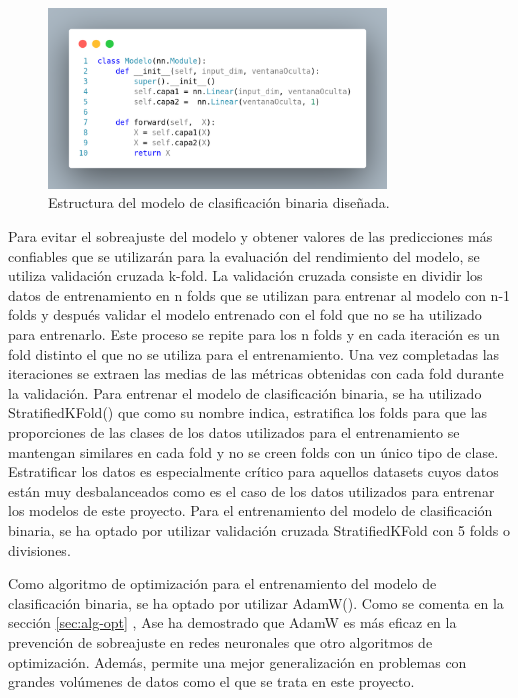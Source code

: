 \begin{figure}[H]
    \centering
    \includegraphics[width=0.8\textwidth]{./img/modelo/modeloBIN.png}
    \caption{Estructura del modelo de clasificación binaria diseñada.}
    \label{fig:modBIN}
\end{figure}

Para evitar el sobreajuste del modelo y obtener valores de las predicciones más confiables que se utilizarán para la evaluación del rendimiento del modelo, se utiliza validación cruzada k-fold. La validación cruzada consiste en dividir los datos de entrenamiento en n folds que se utilizan para entrenar al modelo con n-1 folds y después validar el modelo entrenado con el fold que no se ha utilizado para entrenarlo. Este proceso se repite para los n folds y en cada iteración es un fold distinto el que no se utiliza para el entrenamiento. Una vez completadas las iteraciones se extraen las medias de las métricas obtenidas con cada fold durante la validación. Para entrenar el modelo de clasificación binaria, se ha utilizado StratifiedKFold() que como su nombre indica, estratifica los folds para que las proporciones de las clases de los datos utilizados para el entrenamiento se mantengan similares en cada fold y no se creen folds con un único tipo de clase. Estratificar los datos es especialmente crítico para aquellos datasets cuyos datos están muy desbalanceados como es el caso de los datos utilizados para entrenar los modelos de este proyecto. Para el entrenamiento del modelo de clasificación binaria, se ha optado por utilizar validación cruzada StratifiedKFold con 5 folds o divisiones.

Como algoritmo de optimización para el entrenamiento del modelo de clasificación binaria, se ha optado por utilizar AdamW(). Como se comenta en la sección \ref{sec:alg-opt} , Ase ha demostrado que AdamW es más eficaz en la prevención de sobreajuste en redes neuronales que otro algoritmos de optimización. Además, permite una mejor generalización en problemas con grandes volúmenes de datos como el que se trata en este proyecto.

